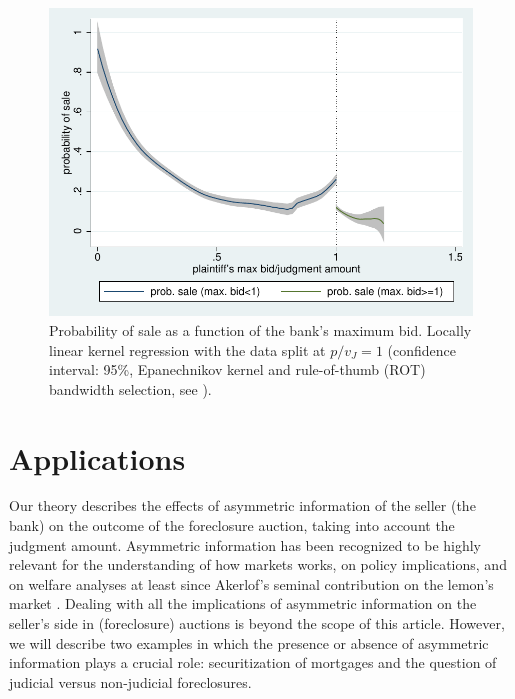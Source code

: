 \documentclass[11pt,twopage]{article}
\begin{document}
\begin{figure}
	\begin{center}
		\includegraphics[width=0.6 \textwidth]{graphics/simple_discontinuity}
		\caption{Probability of sale as a function of the bank's maximum bid. Locally linear kernel regression with the data split at $p/v_J=1$ (confidence interval: 95\%, Epanechnikov kernel and rule-of-thumb (ROT) bandwidth selection, see \cite{fan1996local}).\label{fig:discontinuity-data}}
	\end{center}
\end{figure}


\section{Applications}
\label{sec:applications}

Our theory describes the effects of asymmetric information of the
seller (the bank) on the outcome of the foreclosure auction, taking
into account the judgment amount. Asymmetric information has been
recognized to be highly relevant for the understanding of how markets
works, on policy implications, and on welfare analyses at least since
Akerlof's seminal contribution on the lemon's market \citep{akerlof1970market}. Dealing with all the implications of asymmetric
information on the seller's side in (foreclosure) auctions is beyond
the scope of this article. However, we will describe two examples in
which the presence or absence of asymmetric information plays a
crucial role: securitization of mortgages and the question of judicial
versus non-judicial foreclosures.
\end{document}
